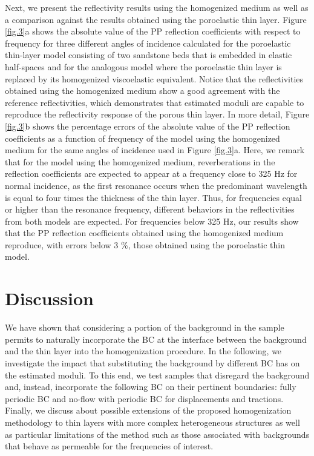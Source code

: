 \documentclass[draft]{agujournal2019}
\begin{document}
Next, we present the reflectivity results using the homogenized medium as well as a comparison against the results obtained using the poroelastic thin layer. 
Figure \ref{fig.3}a shows the absolute value of the PP reflection coefficients with respect to frequency for three different angles of incidence calculated for the poroelastic thin-layer model consisting of two sandstone beds that is embedded in elastic half-spaces and for the analogous model where the poroelastic thin layer is replaced by its homogenized viscoelastic equivalent. Notice that the reflectivities obtained using the homogenized medium show a good agreement with the reference reflectivities, which demonstrates that estimated moduli are capable to reproduce the reflectivity response of the porous thin layer. In more detail,
Figure \ref{fig.3}b shows the percentage errors of the absolute value of the PP reflection coefficients as a function of frequency of the model using the homogenized medium for the same angles of incidence used in Figure \ref{fig.3}a. 
Here, we remark that for the model using the homogenized medium, reverberations in the reflection coefficients are expected to appear at a frequency close to 325 Hz for normal incidence, as the first resonance occurs when the predominant wavelength is  equal to four times the thickness of the thin layer. Thus, for frequencies equal or higher than the resonance frequency, different behaviors in the reflectivities from both models are expected. For frequencies below 325 Hz, our results show that the PP reflection coefficients obtained using the homogenized medium reproduce, with errors below 3 \%, those obtained using the poroelastic thin model. 

\section{Discussion}
We have shown that considering a portion of the background in the sample 
permits to  naturally incorporate the BC at the interface between the background and the thin layer into the homogenization procedure. In the following, we investigate the impact that substituting the background by different BC has on the estimated moduli. To this end, we test samples that disregard the background and, instead, incorporate the following BC on their pertinent boundaries: fully periodic BC and  no-flow with periodic BC for displacements and tractions. Finally, we discuss about possible extensions of the proposed homogenization methodology to thin layers with more complex heterogeneous structures as well as  particular limitations of the method such as those associated with backgrounds that behave as permeable for the frequencies of interest.
\end{document}
